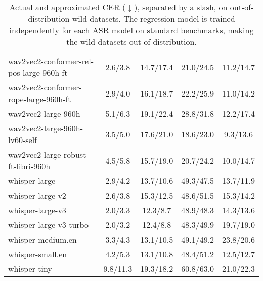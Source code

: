 \begin{table*}[ht]
\begin{tabular}{lcccc}
wav2vec2-conformer-rel-pos-large-960h-ft  & 2.6/3.8             & 14.7/17.4           & 21.0/24.5         & 11.2/14.7              \\
wav2vec2-conformer-rope-large-960h-ft     & 2.9/4.0             & 16.1/18.7           & 22.2/25.9         & 11.0/14.2              \\
wav2vec2-large-960h                       & 5.1/6.3             & 19.1/22.4           & 28.8/31.8         & 12.2/17.4              \\
wav2vec2-large-960h-lv60-self             & 3.5/5.0             & 17.6/21.0           & 18.6/23.0         & 9.3/13.6               \\
wav2vec2-large-robust-ft-libri-960h       & 4.5/5.8             & 15.7/19.0           & 20.7/24.2         & 10.0/14.7              \\
whisper-large                             & 2.9/4.2             & 13.7/10.6           & 49.3/47.5         & 13.7/11.9              \\
whisper-large-v2                          & 2.6/3.8             & 15.3/12.5           & 48.6/51.5         & 15.3/14.2              \\
whisper-large-v3                          & 2.0/3.3             & 12.3/8.7            & 48.9/48.3         & 14.3/13.6              \\
whisper-large-v3-turbo                    & 2.0/3.2             & 12.4/8.8            & 48.3/49.9         & 19.7/19.0              \\
whisper-medium.en                         & 3.3/4.3             & 13.1/10.5           & 49.1/49.2         & 23.8/20.6              \\
whisper-small.en                          & 4.2/5.3             & 13.1/10.8           & 48.4/51.2         & 12.5/12.7              \\
whisper-tiny                              & 9.8/11.3            & 19.3/18.2           & 60.8/63.0         & 21.0/22.3      \\

\bottomrule
\end{tabular}
\caption{Actual and approximated CER ($\downarrow$), separated by a slash, on out-of-distribution wild datasets. The regression model is trained independently for each ASR model on standard benchmarks, making the wild datasets out-of-distribution.}
\label{tab:main_results_in_the_wild_cer}
\end{table*}